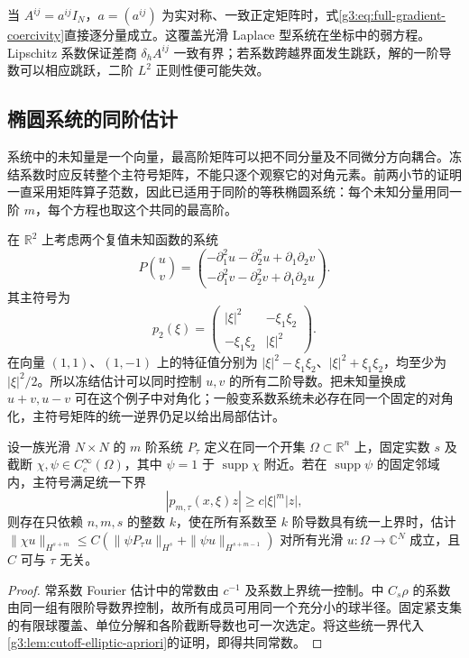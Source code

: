 当 \(A^{ij}=a^{ij}I_N\)，\(a=(a^{ij})\) 为实对称、一致正定矩阵时，式\eqref{g3:eq:full-gradient-coercivity}直接逐分量成立。这覆盖光滑 Laplace 型系统在坐标中的弱方程。Lipschitz 系数保证差商 \(\delta_hA^{ij}\) 一致有界；若系数跨越界面发生跳跃，解的一阶导数可以相应跳跃，二阶 \(L^2\) 正则性便可能失效。

\subsection{椭圆系统的同阶估计}
\label{g3:subsec:1203:04}
系统中的未知量是一个向量，最高阶矩阵可以把不同分量及不同微分方向耦合。冻结系数时应反转整个主符号矩阵，不能只逐个观察它的对角元素。前两小节的证明一直采用矩阵算子范数，因此已适用于同阶的等秩椭圆系统：每个未知分量用同一阶 \(m\)，每个方程也取这个共同的最高阶。

\begin{example}\label{g3:exm:coupled-elliptic-symbol}
	在 \(\mathbb R^2\) 上考虑两个复值未知函数的系统
	\[
		P\binom uv=
		\binom{-\partial_1^2u-\partial_2^2u+\partial_1\partial_2v}
		{-\partial_1^2v-\partial_2^2v+\partial_1\partial_2u}.
	\]
	其主符号为
	\[
		p_2(\xi)=
		\begin{pmatrix}|\xi|^2&-\xi_1\xi_2\\-\xi_1\xi_2&|\xi|^2\end{pmatrix}.
	\]
	在向量 \((1,1)\)、\((1,-1)\) 上的特征值分别为 \( |\xi|^2-\xi_1\xi_2\)、\( |\xi|^2+\xi_1\xi_2\)，均至少为 \( |\xi|^2/2\)。所以冻结估计可以同时控制 \(u,v\) 的所有二阶导数。把未知量换成 \(u+v,u-v\) 可在这个例子中对角化；一般变系数系统未必存在同一个固定的对角化，主符号矩阵的统一逆界仍足以给出局部估计。
\end{example}

\begin{proposition}\label{g3:prop:uniform-system-localization}
	设一族光滑 \(N\times N\) 的 \(m\) 阶系统 \(P_\tau\) 定义在同一个开集 \(\Omega\subset\mathbb R^n\) 上，固定实数 \(s\) 及截断 \(\chi,\psi\in C_c^\infty(\Omega)\)，其中 \(\psi=1\) 于 \(\operatorname{supp}\chi\) 附近。若在 \(\operatorname{supp}\psi\) 的固定邻域内，主符号满足统一下界
	\[
		|p_{m,\tau}(x,\xi)z|\ge c|\xi|^m|z|,
	\]
	则存在只依赖 \(n,m,s\) 的整数 \(k\)，使在所有系数至 \(k\) 阶导数具有统一上界时，估计 \(\|\chi u\|_{H^{s+m}}\le C(\|\psi P_\tau u\|_{H^s}+\|\psi u\|_{H^{s+m-1}})\) 对所有光滑 \(u:\Omega\to\mathbb C^N\) 成立，且 \(C\) 可与 \(\tau\) 无关。
\end{proposition}
\begin{proof}
	常系数 Fourier 估计中的常数由 \(c^{-1}\) 及系数上界统一控制。中 \(C_s\rho\) 的系数由同一组有限阶导数界控制，故所有成员可用同一个充分小的球半径。固定紧支集的有限球覆盖、单位分解和各阶截断导数也可一次选定。将这些统一界代入\cref{g3:lem:cutoff-elliptic-apriori}的证明，即得共同常数。
\end{proof}

